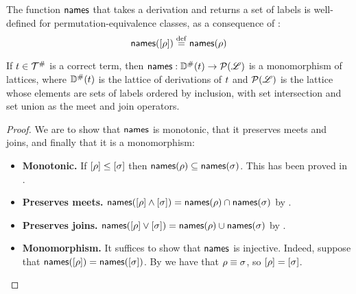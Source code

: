 \begin{remark}
The function $\mathsf{names}$ that takes a derivation and returns a set of labels
is well-defined for permutation-equivalence classes,
as a consequence of :
\[
  \mathsf{names}([\rho]) \overset{\mathrm{def}}{=} \mathsf{names}(\rho)
\]
\end{remark}

\begin{theorem}
If $t \in \mathcal{T}^{\mathtt{\#}}$ is a correct term,
then $\mathsf{names} : \mathbb{D}^{\mathtt{\#}}(t) \to \mathcal{P}(\mathscr{L})$ is a monomorphism of lattices,
where $\mathbb{D}^{\mathtt{\#}}(t)$ is the lattice of derivations of $t$
and $\mathcal{P}(\mathscr{L})$ is the lattice whose elements are sets of labels
ordered by inclusion, with set intersection and set union as
the meet and join operators.
\end{theorem}
\begin{proof}
We are to show that $\mathsf{names}$ is monotonic, that it preserves meets and joins,
and finally that it is a monomorphism:
\begin{itemize}
\item {\bf Monotonic.}
  If ${[\rho]} \leq {[\sigma]}$
  then $\mathsf{names}(\rho) \subseteq \mathsf{names}(\sigma)$.
  This has been proved in .
\item {\bf Preserves meets.}
  $\mathsf{names}({[\rho]} \land {[\sigma]}) =
   \mathsf{names}(\rho) \cap \mathsf{names}(\sigma)$
  by .
\item {\bf Preserves joins.}
  $\mathsf{names}({[\rho]} \lor {[\sigma]}) =
   \mathsf{names}(\rho) \cup \mathsf{names}(\sigma)$
  by .
\item {\bf Monomorphism.}
  It suffices to show that $\mathsf{names}$ is injective.
  Indeed, 
  suppose that $\mathsf{names}({[\rho]}) = \mathsf{names}({[\sigma]})$.
  By 
  we have that $\rho \equiv \sigma$,
  so
  ${[\rho]} = {[\sigma]}$.
\end{itemize}
\end{proof}

